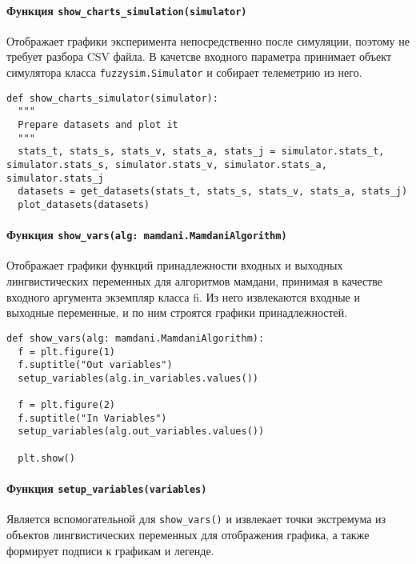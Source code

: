 \paragraph{Функция \lstinline!show_charts_simulation(simulator)!}

Отображает графики эксперимента непосредственно после симуляции, поэтому не требует разбора CSV файла. В качетсве входного параметра принимает объект симулятора класса \lstinline!fuzzysim.Simulator! и собирает телеметрию из него.

\begin{lstlisting}[style=pythonstyle,caption={  }, label=lst:func:1]
def show_charts_simulator(simulator):
  """
  Prepare datasets and plot it
  """
  stats_t, stats_s, stats_v, stats_a, stats_j = simulator.stats_t, simulator.stats_s, simulator.stats_v, simulator.stats_a, simulator.stats_j
  datasets = get_datasets(stats_t, stats_s, stats_v, stats_a, stats_j)
  plot_datasets(datasets)
\end{lstlisting}

\paragraph{Функция \lstinline!show_vars(alg: mamdani.MamdaniAlgorithm)!}

Отображает графики функций принадлежности входных и выходных лингвистических переменных для алгоритмов мамдани, принимая в качестве входного аргумента экземпляр класса fi. Из него извлекаются входные и выходные переменные, и по ним строятся графики принадлежностей.

\begin{lstlisting}[style=pythonstyle,caption={  }, label=lst:func:1]
def show_vars(alg: mamdani.MamdaniAlgorithm):
  f = plt.figure(1)
  f.suptitle("Out variables")
  setup_variables(alg.in_variables.values())

  f = plt.figure(2)
  f.suptitle("In Variables")
  setup_variables(alg.out_variables.values())

  plt.show()
\end{lstlisting}

\paragraph{Функция \lstinline!setup_variables(variables)!}

Является вспомогательной для \lstinline!show_vars()! и извлекает точки экстремума из объектов лингвистических переменных для отображения графика, а также формирует подписи к графикам и легенде.

